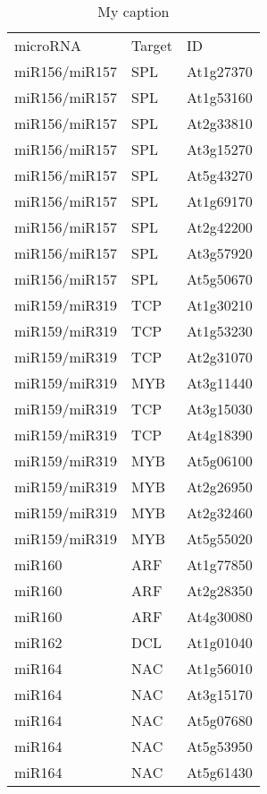 \begin{table}
\tiny
\centering
\caption{My caption}
\label{table:NAR_table_S3}
\begin{tabular}{lll}
microRNA      & Target       & ID        \\
miR156/miR157 & SPL          & At1g27370 \\
miR156/miR157 & SPL          & At1g53160 \\
miR156/miR157 & SPL          & At2g33810 \\
miR156/miR157 & SPL          & At3g15270 \\
miR156/miR157 & SPL          & At5g43270 \\
miR156/miR157 & SPL          & At1g69170 \\
miR156/miR157 & SPL          & At2g42200 \\
miR156/miR157 & SPL          & At3g57920 \\
miR156/miR157 & SPL          & At5g50670 \\
miR159/miR319 & TCP          & At1g30210 \\
miR159/miR319 & TCP          & At1g53230 \\
miR159/miR319 & TCP          & At2g31070 \\
miR159/miR319 & MYB          & At3g11440 \\
miR159/miR319 & TCP          & At3g15030 \\
miR159/miR319 & TCP          & At4g18390 \\
miR159/miR319 & MYB          & At5g06100 \\
miR159/miR319 & MYB          & At2g26950 \\
miR159/miR319 & MYB          & At2g32460 \\
miR159/miR319 & MYB          & At5g55020 \\
miR160        & ARF          & At1g77850 \\
miR160        & ARF          & At2g28350 \\
miR160        & ARF          & At4g30080 \\
miR162        & DCL          & At1g01040 \\
miR164        & NAC          & At1g56010 \\
miR164        & NAC          & At3g15170 \\
miR164        & NAC          & At5g07680 \\
miR164        & NAC          & At5g53950 \\
miR164        & NAC          & At5g61430 \\

\end{tabular}
\end{table}
